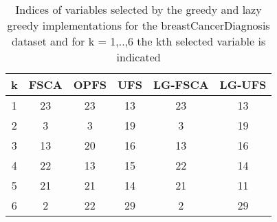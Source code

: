\begin{table}
	\begin{center}
		\begin{tabular}{c c c c c c}
			k & FSCA & OPFS & UFS & LG-FSCA & LG-UFS \\
			\hline
			1 & 23 & 23 & 13 & 23 & 13 \\
			2 & 3 & 3 & 19 & 3 & 19 \\
			3 & 13 & 20 & 16 & 13 & 16 \\
			4 & 22 & 13 & 15 & 22 & 14 \\
			5 & 21 & 21 & 14 & 21 & 11 \\
			6 & 2 & 22 & 29 & 2 & 29 \\
		\end{tabular}
	\end{center}
	\caption{Indices of variables selected by the greedy and lazy greedy implementations for the breastCancerDiagnosis dataset and for k = 1,..,6 the kth selected variable is indicated}
\end{table}